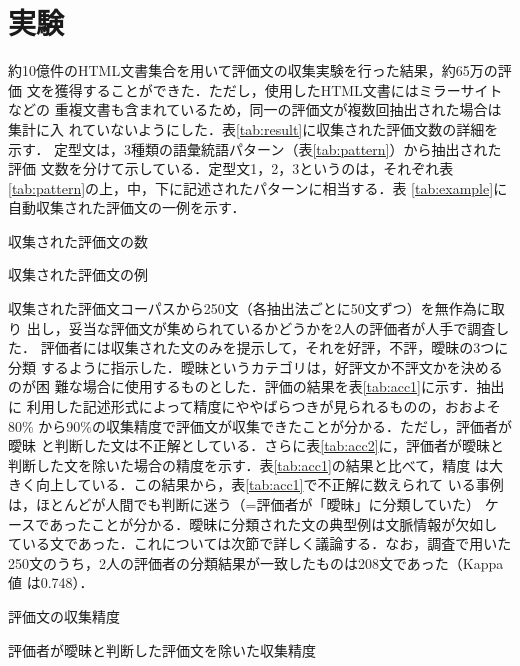 \documentclass[japanese]{jnlp_1.4}
\begin{document}
\section{実験}

約10億件のHTML文書集合を用いて評価文の収集実験を行った結果，約65万の評価
文を獲得することができた．ただし，使用したHTML文書にはミラーサイトなどの
重複文書も含まれているため，同一の評価文が複数回抽出された場合は集計に入
れていないようにした．表\ref{tab:result}に収集された評価文数の詳細を示す．
定型文は，3種類の語彙統語パターン（表\ref{tab:pattern}）から抽出された評価
文数を分けて示している．定型文1，2，3というのは，それぞれ表
\ref{tab:pattern}の上，中，下に記述されたパターンに相当する．表
\ref{tab:example}に自動収集された評価文の一例を示す．

\begin{table}[b]
\begin{minipage}[t]{168pt}
  \caption{収集された評価文の数}
  \label{tab:result}

\end{minipage}
\hfill
\begin{minipage}[t]{220pt}
  \caption{収集された評価文の例}
  \label{tab:example}

\end{minipage}
\end{table}


収集された評価文コーパスから250文（各抽出法ごとに50文ずつ）を無作為に取り
出し，妥当な評価文が集められているかどうかを2人の評価者が人手で調査した．
評価者には収集された文のみを提示して，それを好評，不評，曖昧の3つに分類
するように指示した．曖昧というカテゴリは，好評文か不評文かを決めるのが困
難な場合に使用するものとした．評価の結果を表\ref{tab:acc1}に示す．抽出に
利用した記述形式によって精度にややばらつきが見られるものの，おおよそ80\%
から90\%の収集精度で評価文が収集できたことが分かる．ただし，評価者が曖昧
と判断した文は不正解としている．さらに表\ref{tab:acc2}に，評価者が曖昧と
判断した文を除いた場合の精度を示す．表\ref{tab:acc1}の結果と比べて，精度
は大きく向上している．この結果から，表\ref{tab:acc1}で不正解に数えられて
いる事例は，ほとんどが人間でも判断に迷う（=評価者が「曖昧」に分類していた）
ケースであったことが分かる．曖昧に分類された文の典型例は文脈情報が欠如し
ている文であった．これについては次節で詳しく議論する．なお，調査で用いた
250文のうち，2人の評価者の分類結果が一致したものは208文であった（Kappa値
は0.748）．

\begin{table}[b]
\begin{minipage}{176pt}
  \caption{評価文の収集精度}
  \label{tab:acc1}

\end{minipage}
\hfill
\begin{minipage}{228pt}
  \caption{評価者が曖昧と判断した評価文を除いた収集精度}
  \label{tab:acc2}

\end{minipage}
\end{table}
\end{document}
